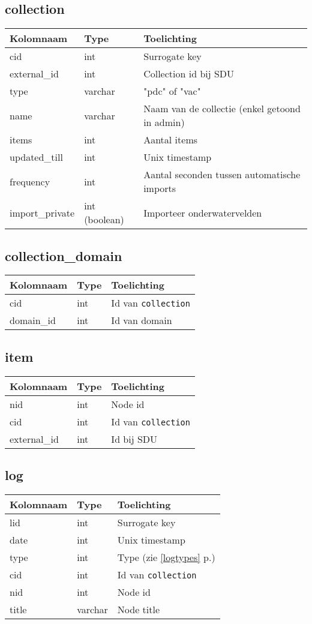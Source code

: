 \documentclass[12pt]{article}
\newcommand{\seeone}[1]{ (zie \ref{#1} p.\pageref{#1})}
\begin{document}
\subsection*{collection}
\begin{tabular}{p{} | p{} | p{} }
\textbf{Kolomnaam} & \textbf{Type} & \textbf{Toelichting} \\
\hline
cid & int & Surrogate key \\
external\_id & int & Collection id bij SDU \\
type & varchar & "pdc" of "vac" \\
name & varchar & Naam van de collectie (enkel getoond in admin) \\
items & int & Aantal items \\
updated\_till & int & Unix timestamp \\
frequency & int & Aantal seconden tussen automatische imports \\
import\_private & int (boolean) & Importeer onderwatervelden
\end{tabular}


\subsection*{collection\_domain}
\begin{tabular}{p{} | p{} | p{} }
\textbf{Kolomnaam} & \textbf{Type} & \textbf{Toelichting} \\
\hline
cid & int & Id van \texttt{collection} \\
domain\_id & int & Id van domain
\end{tabular}

\subsection*{item}
\begin{tabular}{p{} | p{} | p{} }
\textbf{Kolomnaam} & \textbf{Type} & \textbf{Toelichting} \\
\hline
nid & int & Node id \\
cid & int & Id van \texttt{collection} \\
external\_id & int & Id bij SDU
\end{tabular}

\subsection*{log}
\begin{tabular}{p{} | p{} | p{} }
\textbf{Kolomnaam} & \textbf{Type} & \textbf{Toelichting} \\
\hline
lid & int & Surrogate key \\
date & int & Unix timestamp \\
type & int & Type\seeone{logtypes} \\
cid & int & Id van \texttt{collection} \\
nid & int & Node id \\
title & varchar & Node title
\end{tabular}
\end{document}
